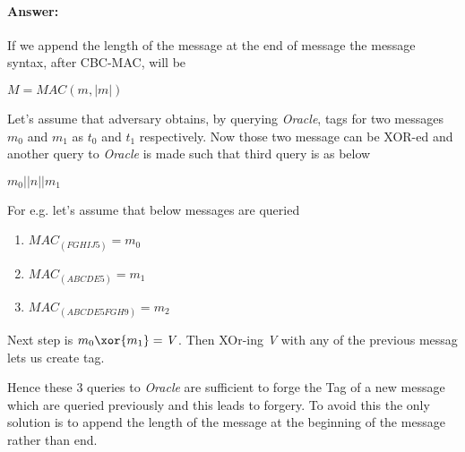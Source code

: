 \documentclass{article}
\begin{document}
    \paragraph{Answer: \newline}
    If we append the length of the message at the end of message the message syntax, after CBC-MAC, will be \newline
    \begin{center}
        $\mathit{M} = MAC(m,|m|)$
    \end{center}
    Let's assume that adversary obtains, by querying \emph{Oracle}, tags for two messages $\mathit{m_0}$ and $\mathit{m_1}$ as $\mathit{t_0}$ and $\mathit{t_1}$ respectively. Now those two message can be XOR-ed and another query to \emph{Oracle} is made such that third query is as below \newline
    \begin{center}
        $\mathit{m_0||n||m_1}$
    \end{center}
    For e.g. let's assume that below messages are queried \newline
    \begin{enumerate}
        \item $MAC_(FGHIJ5) = \mathit{m_0}$
        \item $MAC_(ABCDE5) = \mathit{m_1}$
        \item $MAC_(ABCDE5FGH9) = \mathit{m_2}$
    \end{enumerate}
    
    Next step is ${m_0} \xor {m_1} = \mathit{V}$. Then XOr-ing \emph{V} with any of the previous messag lets us create tag.
    
    Hence these 3 queries to \emph{Oracle} are sufficient to forge the Tag of a new message which are queried previously and this leads to forgery. \newline
    To avoid this the only solution is to append the length of the message at the beginning of the message rather than end.




\end{document}
